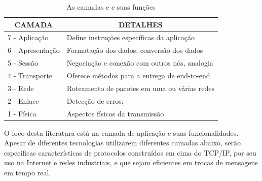 \begin{table}[h]
\centering
\caption{As camadas e e suas funções}
\begin{tabular}{|l|l|}
\hline
\multicolumn{1}{|c|}{CAMADA} & \multicolumn{1}{c|}{DETALHES}                                                  \\ \hline
7 - Aplicação                & Define instruções específicas da aplicação          						    \\ \hline
6 - Apresentação             & Formatação dos dados, conversão dos dados                     					\\ \hline
5 - Sessão                   & Negociação e conexão com outros nós, analogia                                \\ \hline
4 - Transporte               & Oferece métodos para a entrega de end-to-end                        			\\ \hline
3 - Rede                     & Roteamento de pacotes em uma ou várias redes                                 \\ \hline
2 - Enlace                   & Detecção de erros;                                                            \\ \hline
1 - Física                   & Aspectos físicos da transmissão \\ \hline
\end{tabular}
\label{table:1.2.0}
\end{table}


O foco desta literatura está na camada de aplicação e suas funcionalidades. Apesar de diferentes tecnologias utilizarem diferentes camadas abaixo, serão especificas características de protocolos construídos em cima do TCP/IP, por seu uso na Internet e redes industriais, e que sejam eficientes em trocas de mensagens em tempo real.

